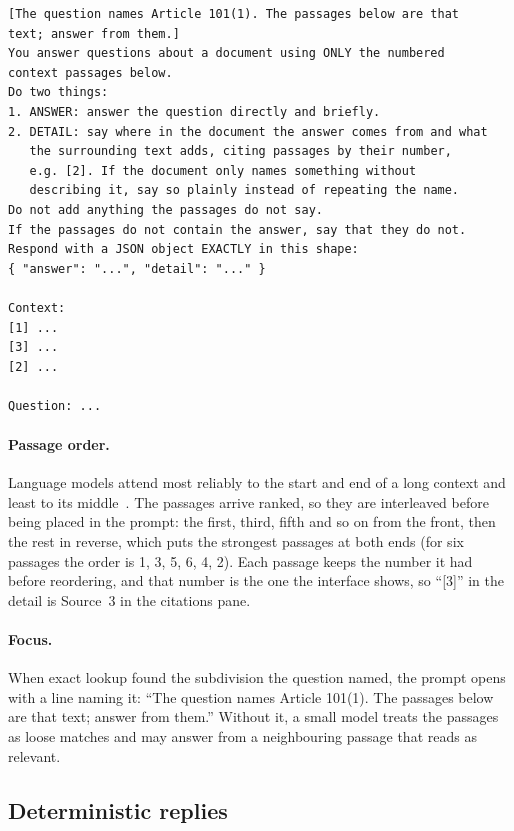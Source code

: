 \begin{lstlisting}[float, caption={The prompt, abridged
(\texttt{generation/basic\_backend.py}).}, label={lst:prompt}]
[The question names Article 101(1). The passages below are that
text; answer from them.]
You answer questions about a document using ONLY the numbered
context passages below.
Do two things:
1. ANSWER: answer the question directly and briefly.
2. DETAIL: say where in the document the answer comes from and what
   the surrounding text adds, citing passages by their number,
   e.g. [2]. If the document only names something without
   describing it, say so plainly instead of repeating the name.
Do not add anything the passages do not say.
If the passages do not contain the answer, say that they do not.
Respond with a JSON object EXACTLY in this shape:
{ "answer": "...", "detail": "..." }

Context:
[1] ...
[3] ...
[2] ...

Question: ...
\end{lstlisting}

\paragraph{Passage order.} Language models attend most reliably to the start
and end of a long context and least to its middle~\cite{liu2024lost}. The
passages arrive ranked, so they are interleaved before being placed in the
prompt: the first, third, fifth and so on from the front, then the rest in
reverse, which puts the strongest passages at both ends (for six passages the
order is 1, 3, 5, 6, 4, 2). Each passage keeps the number it had before
reordering, and that number is the one the interface shows, so ``[3]'' in the
detail is Source~3 in the citations pane.

\paragraph{Focus.} When exact lookup found the subdivision the question named,
the prompt opens with a line naming it: ``The question names Article 101(1).
The passages below are that text; answer from them.'' Without it, a small
model treats the passages as loose matches and may answer from a neighbouring
passage that reads as relevant.

\subsection{Deterministic replies}

